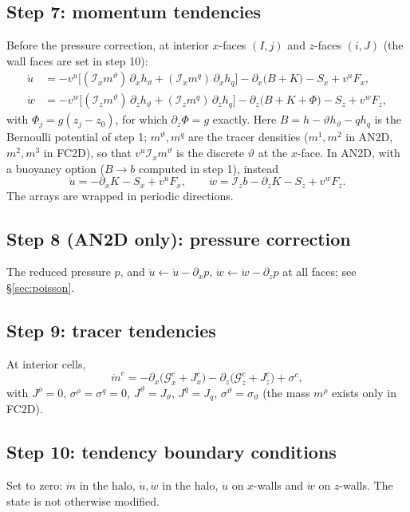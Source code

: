 \documentclass[11pt,a4paper]{article}
\newcommand{\vt}{\vartheta}                    %
\newcommand{\hth}{{h_{\vartheta}}}               %
\newcommand{\hq}{{h_q}}                          %
\newcommand{\Ix}{\mathcal{I}_x}
\newcommand{\Iz}{\mathcal{I}_z}
\begin{document}
\subsection{Step 7: momentum tendencies}
Before the pressure correction, at interior $x$-faces $(I,j)$ and $z$-faces $(i,J)$ (the wall faces are set in step 10):
\begin{align}
  \dot u&=-v^u\Big[(\Ix m^\vt)\,\partial_x\hth+(\Ix m^q)\,\partial_x\hq\Big]-\partial_x\big(B+K\big)-S_x+v^uF_x,
  \label{eq:udot}\\
  \dot w&=-v^w\Big[(\Iz m^\vt)\,\partial_z\hth+(\Iz m^q)\,\partial_z\hq\Big]-\partial_z\big(B+K+\Phi\big)-S_z+v^wF_z,
  \label{eq:wdot}
\end{align}
with $\Phi_j=g(z_j-z_0)$, for which $\partial_z\Phi=g$ exactly. Here $B=h-\vt\hth-q\hq$ is the Bernoulli potential of step 1; $m^\vt,m^q$ are the tracer densities ($m^1,m^2$ in AN2D, $m^2,m^3$ in FC2D), so that $v^u\Ix m^\vt$ is the discrete $\vt$ at the $x$-face.
In AN2D, with a buoyancy option ($B\to b$ computed in step 1), instead
\begin{equation}
  \dot u=-\partial_xK-S_x+v^uF_x,\qquad\dot w=\Iz b-\partial_zK-S_z+v^wF_z .
\end{equation}
The arrays are wrapped in periodic directions.

\subsection{Step 8 (AN2D only): pressure correction}
The reduced pressure $p$, and $\dot u\leftarrow\dot u-\partial_xp$, $\dot w\leftarrow\dot w-\partial_zp$ at all faces; see \S\ref{sec:poisson}.

\subsection{Step 9: tracer tendencies}
At interior cells,
\begin{equation}
  \dot m^c=-\partial_x\big(\mathcal G^c_x+J^c_x\big)-\partial_z\big(\mathcal G^c_z+J^c_z\big)+\sigma^c,
  \label{eq:mdot}
\end{equation}
with $J^\rho=0$, $\sigma^\rho=\sigma^q=0$, $J^\vt=J_\vt$, $J^q=J_q$, $\sigma^\vt=\sigma_\vt$ (the mass $m^\rho$ exists only in FC2D).

\subsection{Step 10: tendency boundary conditions}
Set to zero: $\dot m$ in the halo, $\dot u,\dot w$ in the halo, $\dot u$ on $x$-walls and $\dot w$ on $z$-walls. The state is not otherwise modified.
\end{document}
